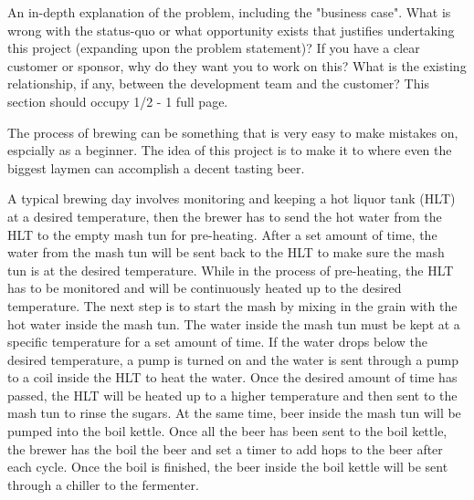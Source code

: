 An in-depth explanation of the problem, including the "business case". What is wrong with the status-quo or what opportunity exists that justifies undertaking this project (expanding upon the problem statement)? If you have a clear customer or sponsor, why do they want you to work on this? What is the existing relationship, if any, between the development team and the customer? This section should occupy 1/2 - 1 full page.

\vspace{5mm}

The process of brewing can be something that is very easy to make mistakes on, espcially as a beginner. The idea of this project is to make it to where even the biggest laymen can accomplish a decent tasting beer.


\vspace{5mm}

A typical brewing day involves monitoring and keeping a hot liquor tank (HLT) at a desired temperature, then the
brewer has to send the hot water from the HLT to the empty mash tun for pre-heating. After a set amount of time, the water from the mash tun
will be sent back to the HLT to make sure the mash tun is at the desired temperature. While in the process of
pre-heating, the HLT has to be monitored and will be continuously heated up to the desired temperature. The next step is to start
the mash by mixing in the grain with the hot water inside the mash tun. The water inside the mash tun must be kept at a specific
temperature for a set amount of time. If the water drops below the desired temperature, a pump is turned on and the water
is sent through a pump to a coil inside the HLT to heat the water. Once the desired amount of time has passed, the HLT will
be heated up to a higher temperature and then sent to the mash tun to rinse the sugars.
At the same time, beer inside the mash tun will be pumped into the boil kettle.
Once all the beer has been sent to the boil kettle, the brewer has the boil the beer and set a timer to add hops to the beer
after each cycle. Once the boil is finished, the beer inside the boil kettle will be sent through a chiller to the fermenter.